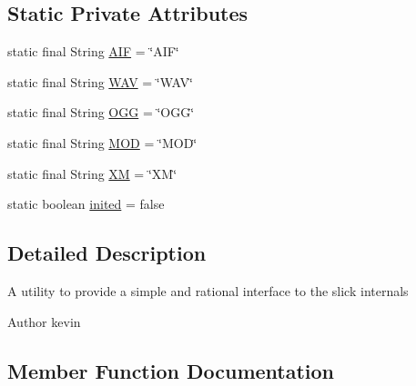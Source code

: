\subsection*{Static Private Attributes}
\begin{DoxyCompactItemize}
\item 
static final String \mbox{\hyperlink{classorg_1_1newdawn_1_1slick_1_1openal_1_1_audio_loader_a024d05c95399aa1523b15b37c34d58b6}{A\+IF}} = \char`\"{}A\+IF\char`\"{}
\item 
static final String \mbox{\hyperlink{classorg_1_1newdawn_1_1slick_1_1openal_1_1_audio_loader_a34a9e47a5090ab343885f032a800082d}{W\+AV}} = \char`\"{}W\+AV\char`\"{}
\item 
static final String \mbox{\hyperlink{classorg_1_1newdawn_1_1slick_1_1openal_1_1_audio_loader_ad4fe9acae97947804dc4c70ef7bbff24}{O\+GG}} = \char`\"{}O\+GG\char`\"{}
\item 
static final String \mbox{\hyperlink{classorg_1_1newdawn_1_1slick_1_1openal_1_1_audio_loader_a24d845d2340fdda4197cb5654963b3d2}{M\+OD}} = \char`\"{}M\+OD\char`\"{}
\item 
static final String \mbox{\hyperlink{classorg_1_1newdawn_1_1slick_1_1openal_1_1_audio_loader_adfb5103d54cb3853abc1ec6d0f4c002f}{XM}} = \char`\"{}XM\char`\"{}
\item 
static boolean \mbox{\hyperlink{classorg_1_1newdawn_1_1slick_1_1openal_1_1_audio_loader_a9c9bf94e8f3380290bb6abd89c82d66c}{inited}} = false
\end{DoxyCompactItemize}


\subsection{Detailed Description}
A utility to provide a simple and rational interface to the slick internals

\begin{DoxyAuthor}{Author}
kevin 
\end{DoxyAuthor}


\subsection{Member Function Documentation}
\mbox{\label{classorg_1_1newdawn_1_1slick_1_1openal_1_1_audio_loader_a122ea3006a94beb60a54c57d8c36520c}} 
